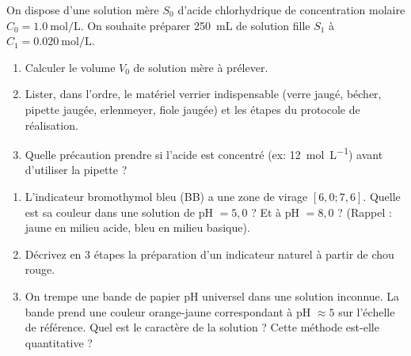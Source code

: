 \documentclass[11pt]{article}
\begin{document}
\begin{exercice}
On dispose d'une solution mère $S_0$ d'acide chlorhydrique de concentration molaire $C_0 = \SI{1,0}{\mol\per\liter}$. On souhaite préparer \SI{250}{\milli\liter} de solution fille $S_1$ à $C_1 = \SI{0,020}{\mol\per\liter}$.
\begin{enumerate}
    \item Calculer le volume $V_0$ de solution mère à prélever.
    \item Lister, dans l'ordre, le matériel verrier indispensable (verre jaugé, bécher, pipette jaugée, erlenmeyer, fiole jaugée) et les étapes du protocole de réalisation.
    \item Quelle précaution prendre si l'acide est concentré (ex: \SI{12}{\mol\per\liter}) avant d'utiliser la pipette ?
\end{enumerate}
\end{exercice}

\begin{exercice}
\begin{enumerate}
    \item L'indicateur bromothymol bleu (BB) a une zone de virage $[6,0 ; 7,6]$. Quelle est sa couleur dans une solution de pH $= 5,0$ ? Et à pH $= 8,0$ ? (Rappel : jaune en milieu acide, bleu en milieu basique).
    \item Décrivez en 3 étapes la préparation d'un indicateur naturel à partir de chou rouge.
    \item On trempe une bande de papier pH universel dans une solution inconnue. La bande prend une couleur orange-jaune correspondant à pH $\approx 5$ sur l'échelle de référence. Quel est le caractère de la solution ? Cette méthode est-elle quantitative ?
\end{enumerate}
\end{exercice}
\end{document}
